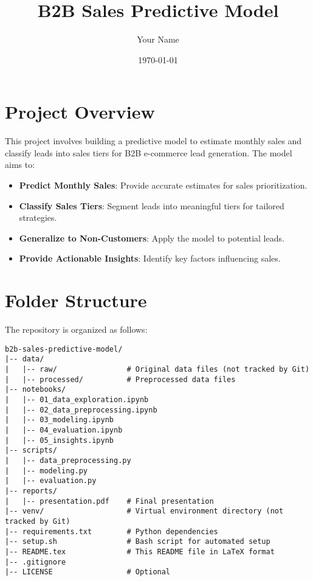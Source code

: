 \documentclass{article}
\title{B2B Sales Predictive Model}
\author{Your Name}
\date{\today}
\begin{document}
\maketitle

\tableofcontents

\section{Project Overview}

This project involves building a predictive model to estimate monthly sales and classify leads into sales tiers for B2B e-commerce lead generation. The model aims to:

\begin{itemize}
    \item \textbf{Predict Monthly Sales}: Provide accurate estimates for sales prioritization.
    \item \textbf{Classify Sales Tiers}: Segment leads into meaningful tiers for tailored strategies.
    \item \textbf{Generalize to Non-Customers}: Apply the model to potential leads.
    \item \textbf{Provide Actionable Insights}: Identify key factors influencing sales.
\end{itemize}

\section{Folder Structure}

The repository is organized as follows:

\begin{verbatim}
b2b-sales-predictive-model/
|-- data/
|   |-- raw/                # Original data files (not tracked by Git)
|   |-- processed/          # Preprocessed data files
|-- notebooks/
|   |-- 01_data_exploration.ipynb
|   |-- 02_data_preprocessing.ipynb
|   |-- 03_modeling.ipynb
|   |-- 04_evaluation.ipynb
|   |-- 05_insights.ipynb
|-- scripts/
|   |-- data_preprocessing.py
|   |-- modeling.py
|   |-- evaluation.py
|-- reports/
|   |-- presentation.pdf    # Final presentation
|-- venv/                   # Virtual environment directory (not tracked by Git)
|-- requirements.txt        # Python dependencies
|-- setup.sh                # Bash script for automated setup
|-- README.tex              # This README file in LaTeX format
|-- .gitignore
|-- LICENSE                 # Optional
\end{verbatim}
\end{document}
